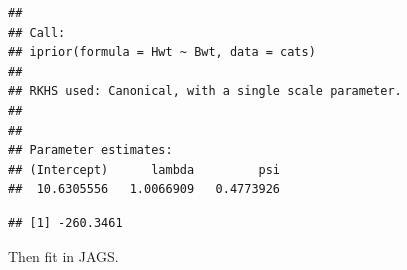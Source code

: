 \documentclass[english, 11pt]{article}
\begin{document}
\begin{knitrout}
\color{fgcolor}\begin{kframe}
\begin{alltt}
 \hlkwb{<-}  \hlopt{~}   
                       \hlstd{=} \hlstd{(} \hlstd{=} \hlstd{)))}
\end{alltt}
\begin{verbatim}
## 
## Call:
## iprior(formula = Hwt ~ Bwt, data = cats)
## 
## RKHS used: Canonical, with a single scale parameter.
## 
## 
## Parameter estimates:
## (Intercept)      lambda         psi 
##  10.6305556   1.0066909   0.4773926
\end{verbatim}
\begin{alltt}
\end{alltt}
\begin{verbatim}
## [1] -260.3461
\end{verbatim}
\end{kframe}
\end{knitrout}

Then fit in JAGS.

\begin{knitrout}
\color{fgcolor}\begin{kframe}
\begin{alltt}
 \hlkwb{<-} \hlstd{() \{}
     \hlopt{:}
     \hlopt{~} \hlstd{(}
     \hlkwb{<-}  \hlopt{*} \hlstd{(H[i, ], w[}\hlopt{:}\hlstd{n])}
     \hlopt{~} 
  \hlstd{\}}

   \hlopt{~} \hlstd{(}\hlstd{,} \hlstd{)}
   \hlopt{~} \hlstd{(}\hlstd{,} \hlstd{)}
   \hlkwb{<-}  \hlopt{/} 
\hlstd{\}}
 \hlkwb{<-} \hlstd{(} \hlopt{$} \hlopt{-} \hlopt{$}  \hlstd{=} \hlopt{$}
                  \hlstd{=} \hlopt{$}
 \hlkwb{<-} \hlstd{(}\hlstd{,} \hlstd{)}
\end{alltt}
\end{kframe}
\end{knitrout}
\end{document}
